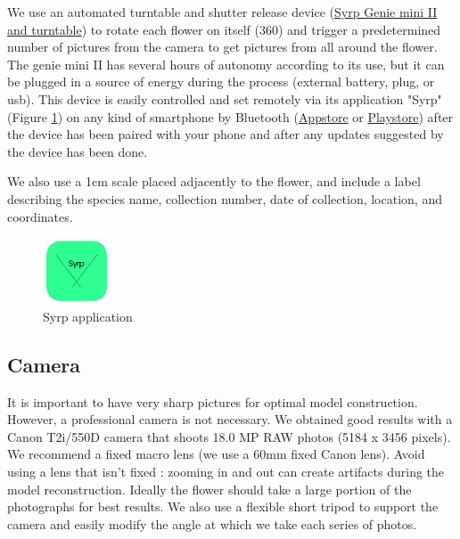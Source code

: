\documentclass[10pt,letter,english]{article}
\begin{document}
We use an automated turntable and shutter release device (\href{https://www.bhphotovideo.com/c/product/1486043-REG/syrp_sykit_0043_genie_mini_ii_turntable.html/quick-compare}{Syrp Genie mini II and turntable}) to rotate each flower on itself (360\degree \hspace{0.01cm}) and trigger a predetermined number of pictures from the camera to get pictures from all around the flower. 
The genie mini II has several hours of autonomy according to its use, but it can be plugged in a source of energy during the process (external battery, plug, or usb). This device is easily controlled and set remotely via its application "Syrp" (Figure \ref{fig:syrp_app}) on any kind of smartphone by Bluetooth (\href{https://apps.apple.com/us/app/syrp/id1387335063}{Appstore} or \href{https://play.google.com/store/apps/details?id=nz.co.syrp.genie2&hl=fr_CA&gl=US}{Playstore}) after the device has been paired with your phone and after any updates suggested by the device has been done. 

We also use a 1cm scale placed adjacently to the flower, and include a label describing the species name, collection number, date of collection, location, and coordinates.

\begin{figure}[H]
    \centering
    \includegraphics[width=2cm]{Figures/Syrp_app.png}
    \caption{Syrp application}
    \label{fig:syrp_app}
\end{figure}

\subsection{Camera}

It is important to have very sharp pictures for optimal model construction. However, a professional camera is not necessary. We obtained good results with a Canon T2i/550D camera that shoots 18.0 MP RAW photos (5184 x 3456 pixels). We recommend a fixed macro lens (we use a 60mm fixed Canon lens). Avoid using a lens that isn't fixed : zooming in and out can create artifacts during the model reconstruction. Ideally the flower should take a large portion of the photographs for best results.  We also use a flexible short tripod to support the camera and easily modify the angle at which we take each series of photos.
\end{document}
